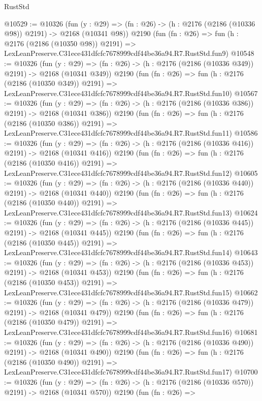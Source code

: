 \begin{lexlean}{RustStd}
\begin{coremodule}
@10529 := @10326
    (fun (y : @29) => (fn : @26) -> (h : @2176 (@2186 (@10336 @98)) @2191) -> @2168 (@10341 @98))
    @2190
    (fun (fn : @26) =>
    fun (h : @2176 (@2186 (@10350 @98)) @2191) =>
    LexLeanPreserve.C31ece431dfcfc7678999cdf44be36a94.R7.RustStd.fun9)
@10548 := @10326
    (fun (y : @29) => (fn : @26) -> (h : @2176 (@2186 (@10336 @349)) @2191) -> @2168 (@10341 @349))
    @2190
    (fun (fn : @26) =>
    fun (h : @2176 (@2186 (@10350 @349)) @2191) =>
    LexLeanPreserve.C31ece431dfcfc7678999cdf44be36a94.R7.RustStd.fun10)
@10567 := @10326
    (fun (y : @29) => (fn : @26) -> (h : @2176 (@2186 (@10336 @386)) @2191) -> @2168 (@10341 @386))
    @2190
    (fun (fn : @26) =>
    fun (h : @2176 (@2186 (@10350 @386)) @2191) =>
    LexLeanPreserve.C31ece431dfcfc7678999cdf44be36a94.R7.RustStd.fun11)
@10586 := @10326
    (fun (y : @29) => (fn : @26) -> (h : @2176 (@2186 (@10336 @416)) @2191) -> @2168 (@10341 @416))
    @2190
    (fun (fn : @26) =>
    fun (h : @2176 (@2186 (@10350 @416)) @2191) =>
    LexLeanPreserve.C31ece431dfcfc7678999cdf44be36a94.R7.RustStd.fun12)
@10605 := @10326
    (fun (y : @29) => (fn : @26) -> (h : @2176 (@2186 (@10336 @440)) @2191) -> @2168 (@10341 @440))
    @2190
    (fun (fn : @26) =>
    fun (h : @2176 (@2186 (@10350 @440)) @2191) =>
    LexLeanPreserve.C31ece431dfcfc7678999cdf44be36a94.R7.RustStd.fun13)
@10624 := @10326
    (fun (y : @29) => (fn : @26) -> (h : @2176 (@2186 (@10336 @445)) @2191) -> @2168 (@10341 @445))
    @2190
    (fun (fn : @26) =>
    fun (h : @2176 (@2186 (@10350 @445)) @2191) =>
    LexLeanPreserve.C31ece431dfcfc7678999cdf44be36a94.R7.RustStd.fun14)
@10643 := @10326
    (fun (y : @29) => (fn : @26) -> (h : @2176 (@2186 (@10336 @453)) @2191) -> @2168 (@10341 @453))
    @2190
    (fun (fn : @26) =>
    fun (h : @2176 (@2186 (@10350 @453)) @2191) =>
    LexLeanPreserve.C31ece431dfcfc7678999cdf44be36a94.R7.RustStd.fun15)
@10662 := @10326
    (fun (y : @29) => (fn : @26) -> (h : @2176 (@2186 (@10336 @479)) @2191) -> @2168 (@10341 @479))
    @2190
    (fun (fn : @26) =>
    fun (h : @2176 (@2186 (@10350 @479)) @2191) =>
    LexLeanPreserve.C31ece431dfcfc7678999cdf44be36a94.R7.RustStd.fun16)
@10681 := @10326
    (fun (y : @29) => (fn : @26) -> (h : @2176 (@2186 (@10336 @490)) @2191) -> @2168 (@10341 @490))
    @2190
    (fun (fn : @26) =>
    fun (h : @2176 (@2186 (@10350 @490)) @2191) =>
    LexLeanPreserve.C31ece431dfcfc7678999cdf44be36a94.R7.RustStd.fun17)
@10700 := @10326
    (fun (y : @29) => (fn : @26) -> (h : @2176 (@2186 (@10336 @570)) @2191) -> @2168 (@10341 @570))
    @2190
    (fun (fn : @26) =>

\end{coremodule}
\end{lexlean}

